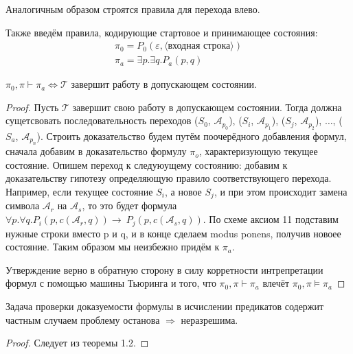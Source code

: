 Аналогичным образом строятся правила для перехода влево. 

Также введём правила, кодирующие стартовое и принимающее состояния:
\begin{gather}
    \pi_0=P_0(\varepsilon, \langle\text{входная строка}\rangle) \\
    \pi_a=\exists p.\exists q.P_a(p, q)
\end{gather}

\begin{theorem} 
    $\pi_0, \pi \vdash \pi_a \Longleftrightarrow \mathcal{T}$ завершит работу в допускающем состоянии.
\end{theorem} 
\begin{proof}
    Пусть $\mathcal{T}$ завершит свою работу в допускающем состоянии. Тогда должна сущетсвовать
    последовательность переходов ($S_0$, $\mathcal{A}_{p_0}$), ($S_i$, $\mathcal{A}_{p_1}$), ($S_j$,
    $\mathcal{A}_{p_2}$), $\ldots$, ($S_a$, $\mathcal{A}_{p_n}$). Строить доказательство будем путём
    поочерёдного добавления формул, сначала добавим в доказательство формулу $\pi_o$, характеризующую
    текущее состояние. Опишем переход к следуюущему состоянию: добавим к доказательству гипотезу
    определяющую правило соответствующего перехода. Например, если текущее состояние $S_i$, а новое
    $S_j$, и при этом происходит замена символа $\mathcal{A}_r$ на $\mathcal{A}_s$, то это будет формула
    $\forall p.\forall q.P_i(p, c(\mathcal{A}_r, q)) \rightarrow\ P_j(p, c(\mathcal{A}_s, q))$. По схеме
    аксиом 11 подставим нужные строки вместо p и q, и в конце сделаем modus ponens, получив новоее
    состояние. Таким образом мы неизбежно придём к $\pi_a$.
    
    Утверждение верно в обратную сторону в силу корретности интрепретации формул с помощью машины
    Тьюринга и того, что $\pi_0, \pi \vdash \pi_a$ влечёт $\pi_0, \pi \vDash \pi_a$
\end{proof}

\begin{theorem}
    Задача проверки доказуемости формулы в исчислении предикатов содержит частным случаем проблему
    останова $\Rightarrow$ неразрешима.
\end{theorem}
\begin{proof}
    Следует из теоремы 1.2.
\end{proof}
